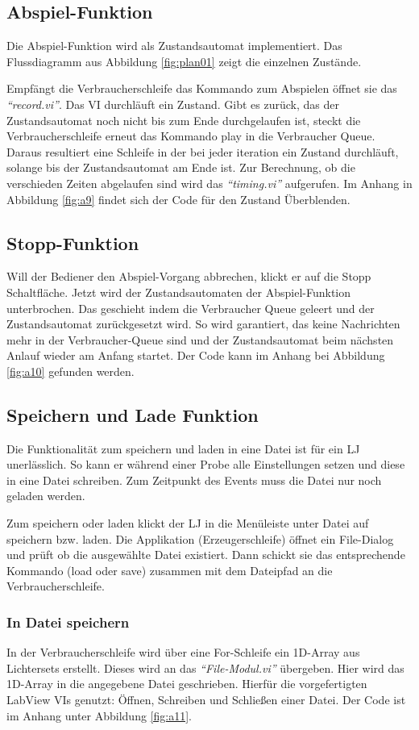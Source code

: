 \subsection{Abspiel-Funktion}
Die Abspiel-Funktion wird als Zustandsautomat implementiert. Das Flussdiagramm aus Abbildung \ref{fig:plan01} zeigt die einzelnen Zustände. 

Empfängt die Verbraucherschleife das Kommando zum Abspielen öffnet sie das \textit{"`record.vi"'}. Das VI durchläuft ein Zustand. Gibt es zurück, das der Zustandsautomat noch nicht bis zum Ende durchgelaufen ist, steckt die Verbraucherschleife erneut das Kommando play in die Verbraucher Queue. Daraus resultiert eine Schleife in der bei jeder iteration ein Zustand durchläuft, solange bis der Zustandsautomat am Ende ist.
Zur Berechnung, ob die verschieden Zeiten abgelaufen sind wird das  \textit{"`timing.vi"'} aufgerufen. Im Anhang in Abbildung \ref{fig:a9} findet sich der Code für den Zustand Überblenden.

\subsection{Stopp-Funktion}
Will der Bediener den Abspiel-Vorgang abbrechen, klickt er auf die Stopp Schaltfläche. Jetzt wird der Zustandsautomaten der Abspiel-Funktion unterbrochen. Das geschieht indem die Verbraucher Queue geleert und der Zustandsautomat zurückgesetzt wird. So wird garantiert, das keine Nachrichten mehr in der Verbraucher-Queue sind und der Zustandsautomat beim nächsten Anlauf wieder am Anfang startet. Der Code kann im Anhang bei Abbildung \ref{fig:a10} gefunden werden.
		
		
\subsection{Speichern und Lade Funktion}
Die Funktionalität zum speichern und laden in eine Datei ist für ein LJ unerlässlich. So kann er während einer Probe alle Einstellungen setzen und diese in eine Datei schreiben. Zum Zeitpunkt des Events muss die Datei nur noch geladen werden. 

Zum speichern oder laden klickt der LJ in die Menüleiste unter Datei auf speichern bzw. laden. Die Applikation (Erzeugerschleife) öffnet ein File-Dialog und prüft ob die ausgewählte Datei existiert. Dann schickt sie das entsprechende Kommando (load oder save) zusammen mit dem Dateipfad an die Verbraucherschleife.

\subsubsection{In Datei speichern}
In der Verbraucherschleife wird über eine For-Schleife ein 1D-Array aus Lichtersets erstellt. Dieses wird an das \textit{"`File-Modul.vi"'} übergeben. Hier wird das 1D-Array in die angegebene Datei geschrieben. Hierfür die vorgefertigten LabView VIs genutzt: Öffnen, Schreiben und Schließen einer Datei. Der Code ist im Anhang unter Abbildung \ref{fig:a11}.

